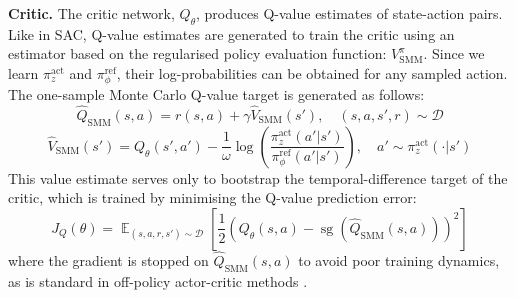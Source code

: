 \documentclass{article} %
\DeclareMathOperator*{\E}{\mathbb{E}}
\newcommand\expectwrt[2]{\E_{#2}\left[ #1 \right]}
\begin{document}
\textbf{Critic.}
    The critic network, $Q_\theta$, produces Q-value estimates of state-action pairs. Like in SAC, Q-value estimates are generated to train the critic using an estimator based on the regularised policy evaluation function: $V^\pi_\text{SMM}$.
    Since we learn $\pi^\text{act}_z$ and $\pi^\text{ref}_\phi$, their log-probabilities can be obtained for any sampled action. The one-sample Monte Carlo Q-value target is generated as follows:
    \begin{equation}
        \label{equ:q_val_target_smm}
        \hat{Q}_\text{SMM}(s,a) = r(s,a) + \gamma \hat{V}_\text{SMM}(s'), \quad (s, a, s', r) \sim \mathcal{D}
    \end{equation}
    \begin{equation}
        \label{eq:SMM_AC_value_hat}
        \hat{V}_\text{SMM}(s') = Q_\theta(s', a') - \frac{1}{\omega} \log \left( \frac{\pi^\text{act}_z(a'|s')}{\pi^\text{ref}_\phi(a'|s')} \right), \quad a' \sim \pi^\text{act}_z(\cdot|s')
    \end{equation}
   This value estimate serves only to bootstrap the temporal-difference target of the critic, which is trained by minimising the Q-value prediction error:
    \begin{equation}
    \label{eq:SMM_Q_loss}
    J_Q(\theta) = \expectwrt{\frac{1}{2}\left( Q_\theta(s, a) - \operatorname{sg}\left( \hat{Q}_\text{SMM}(s,a) \right) \right)^2}{(s, a, r, s') \sim \mathcal{D}}
    \end{equation}
    where the gradient is stopped on $\hat{Q}_\text{SMM}(s,a)$ to avoid poor training dynamics, as is standard in off-policy actor-critic methods \citep{fujimoto2018addressing_TD3, haarnoja2018SAC_2}.
\end{document}
